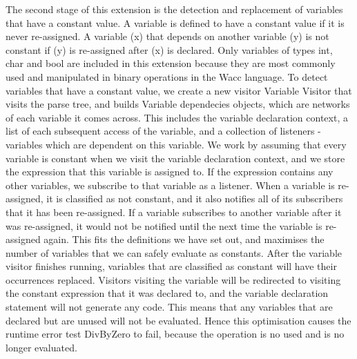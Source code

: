 \documentclass[11pt]{article}
\begin{document}
\medskip

The second stage of this extension is the detection and replacement of variables that have a constant value. A variable is defined to have a constant value if it is never re-assigned. A variable (x) that depends on another variable (y) is not constant if (y) is re-assigned after (x) is declared. Only variables of types int, char and bool are included in this extension because they are most commonly used and manipulated in binary operations in the Wacc language. To detect variables that have a constant value, we create a new visitor Variable Visitor that visits the parse tree, and builds Variable dependecies objects, which are networks of each variable it comes across. This includes the variable declaration context, a list of each subsequent access of the variable, and a collection of listeners - variables which are dependent on this variable. We work by assuming that every variable is constant when we visit the variable declaration context, and we store the expression that this variable is assigned to. If the expression contains any other variables, we subscribe to that variable as a listener. When a variable is re-assigned, it is classified as not constant, and it also notifies all of its subscribers that it has been re-assigned. If a variable subscribes to another variable after it was re-assigned, it would not be notified until the next time the variable is re-assigned again. This fits the definitions we have set out, and maximises the number of variables that we can safely evaluate as constants. After the variable visitor finishes running, variables that are classified as constant will have their occurrences replaced. Visitors visiting the variable will be redirected to visiting the constant expression that it was declared to, and the variable declaration statement will not generate any code. This means that any variables that are declared but are unused will not be evaluated. Hence this optimisation causes the runtime error test DivByZero to fail, because the operation is no used and is no longer evaluated.

\medskip
\end{document}
